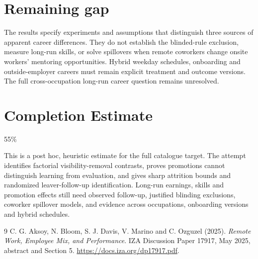\documentclass[11pt]{article}
\theoremstyle{remark}
\begin{document}
\section*{Remaining gap}
The results specify experiments and assumptions that distinguish three sources of apparent career differences. They do not establish the blinded-rule exclusion, measure long-run skills, or solve spillovers when remote coworkers change onsite workers' mentoring opportunities. Hybrid weekday schedules, onboarding and outside-employer careers must remain explicit treatment and outcome versions. The full cross-occupation long-run career question remains unresolved.

\section{Completion Estimate}
55\%

This is a post hoc, heuristic estimate for the full catalogue target.
The attempt identifies factorial visibility-removal contrasts, proves promotions cannot distinguish learning from evaluation, and gives sharp attrition bounds and randomized leaver-follow-up identification. Long-run earnings, skills and promotion effects still need observed follow-up, justified blinding exclusions, coworker spillover models, and evidence across occupations, onboarding versions and hybrid schedules.

\begin{thebibliography}{9}
 C. G. Aksoy, N. Bloom, S. J. Davis, V. Marino and C. Ozguzel (2025). \emph{Remote Work, Employee Mix, and Performance}. IZA Discussion Paper 17917, May 2025, abstract and Section 5. \url{https://docs.iza.org/dp17917.pdf}.
\end{thebibliography}
\end{document}
